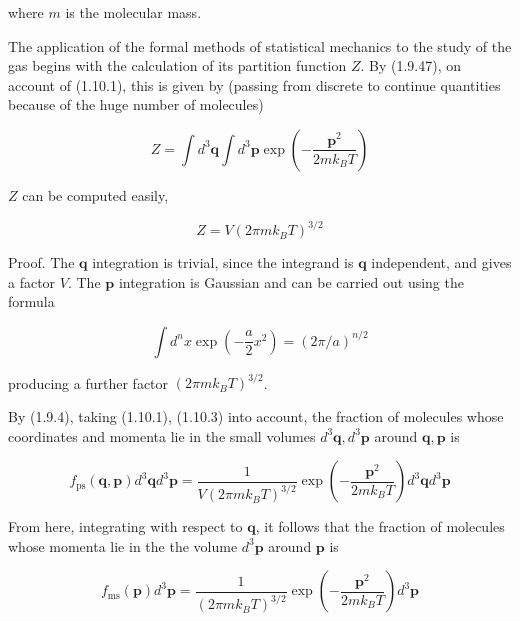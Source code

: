 \documentclass{article}
\begin{document}
where $m$ is the molecular mass.

The application of the formal methods of statistical mechanics to the study of the gas begins with the calculation of its partition function $Z$. By (1.9.47), on account of (1.10.1), this is given by (passing from discrete to continue quantities because of the huge number of molecules)

\begin{equation*}
Z=\int d^{3} \boldsymbol{q} \int d^{3} \boldsymbol{p} \exp \left(-\frac{\boldsymbol{p}^{2}}{2 m k_{B} T}\right) \tag{1.10.2}
\end{equation*}

$Z$ can be computed easily,

\begin{equation*}
Z=V\left(2 \pi m k_{B} T\right)^{3 / 2} \tag{1.10.3}
\end{equation*}


Proof. The $\boldsymbol{q}$ integration is trivial, since the integrand is $\boldsymbol{q}$ independent, and gives a factor $V$. The $\boldsymbol{p}$ integration is Gaussian and can be carried out using the formula
 
\begin{equation*}
\int d^{n} x \exp \left(-\frac{a}{2} x^{2}\right)=(2 \pi / a)^{n / 2} \tag{1.10.4}
\end{equation*}
 
producing a further factor $\left(2 \pi m k_{B} T\right)^{3 / 2}$.

By (1.9.4), taking (1.10.1), (1.10.3) into account, the fraction of molecules whose coordinates and momenta lie in the small volumes $d^{3} \boldsymbol{q}, d^{3} \boldsymbol{p}$ around $\boldsymbol{q}, \boldsymbol{p}$ is
 
\begin{equation*}
f_{\mathrm{ps}}(\boldsymbol{q}, \boldsymbol{p}) d^{3} \boldsymbol{q} d^{3} \boldsymbol{p}=\frac{1}{V\left(2 \pi m k_{B} T\right)^{3 / 2}} \exp \left(-\frac{\boldsymbol{p}^{2}}{2 m k_{B} T}\right) d^{3} \boldsymbol{q} d^{3} \boldsymbol{p} \tag{1.10.5}
\end{equation*}
 

From here, integrating with respect to $\boldsymbol{q}$, it follows that the fraction of molecules whose momenta lie in the the volume $d^{3} \boldsymbol{p}$ around $\boldsymbol{p}$ is
 
\begin{equation*}
f_{\mathrm{ms}}(\boldsymbol{p}) d^{3} \boldsymbol{p}=\frac{1}{\left(2 \pi m k_{B} T\right)^{3 / 2}} \exp \left(-\frac{\boldsymbol{p}^{2}}{2 m k_{B} T}\right) d^{3} \boldsymbol{p} \tag{1.10.6}
\end{equation*}
 
\end{document}

